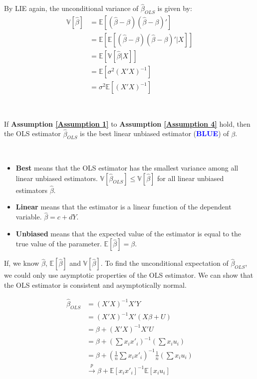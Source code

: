 By LIE again, the unconditional variance of $\hat{\beta}_{OLS}$ is given by:
\begin{align*}
  \mathbb{V}[\hat{\beta}] &= \mathbb{E}[(\hat{\beta} - \beta)(\hat{\beta} - \beta)']\\
  &= \mathbb{E}[\mathbb{E}[(\hat{\beta} - \beta)(\hat{\beta} - \beta)' | X]]\\
  &= \mathbb{E}[\mathbb{V}[\hat{\beta} | X]]\\
  &= \mathbb{E}[\sigma^2(X'X)^{-1}]\\
  &= \sigma^2\mathbb{E}[(X'X)^{-1}]
\end{align*}

\begin{theorem}\label{Gauss-Markov Theorem}
  \

  If \textbf{Assumption \ref{Assumption 1}} to \textbf{Assumption \ref{Assumption 4}} hold, then the OLS estimator $\hat{\beta}_{OLS}$ is the best linear unbiased estimator (\textbf{\textcolor{blue}{BLUE}}) of $\beta$.
  \begin{note}
  \
  
    \begin{itemize}
      \item \textbf{Best} means that the OLS estimator has the smallest variance among all linear unbiased estimators. $\mathbb{V}[\hat{\beta}_{OLS}] \leq \mathbb{V}[\hat{\beta}]$ for all linear unbiased estimators $\hat{\beta}$.
      \item \textbf{Linear} means that the estimator is a linear function of the dependent variable. $\hat{\beta} = c + dY$.
      \item \textbf{Unbiased} means that the expected value of the estimator is equal to the true value of the parameter. $\mathbb{E}[\hat{\beta}] = \beta$.
    \end{itemize}
  \end{note}
\end{theorem}

If, we know $\hat{\beta }$, $\mathbb{E}[\hat{\beta}]$ and $\mathbb{V}[\hat{\beta}]$. To find the unconditional expectation of $\hat{\beta}_{OLS}$, we could only use asymptotic properties of the OLS estimator. We can show that the OLS estimator is consistent and asymptotically normal.

\begin{align*}
  \hat{\beta }_{OLS} &= (X'X)^{-1}X'Y\\
  &= (X'X)^{-1}X'(X\beta + U)\\
  &= \beta + (X'X)^{-1}X'U\\
  &= \beta + \left(\sum x_i x'_i\right)^{-1} \left(\sum x_i u_i \right)\\
  &= \beta + \left(\frac{1}{n}\sum x_i x'_i\right)^{-1} \frac{1}{n}\left(\sum x_i u_i \right)\\
  &\overset{p}{\rightarrow} \beta + \mathbb{E}[x_i x'_i]^{-1} \mathbb{E}[x_i u_i]
\end{align*}

